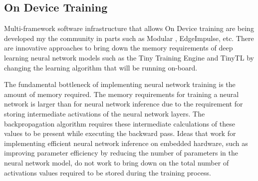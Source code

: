 \subsection{On Device Training}

Multi-framework software infrastructure that allows On Device training are being developed my the community in parts such as Modular \cite{mojo}, EdgeImpulse, etc. There are innovative approaches to bring down the memory requirements of deep learning neural network models such as the Tiny Training Engine \cite{lin2022ondevice} and TinyTL \cite{cai2021tinytl} by changing the learning algorithm that will be running on-board.

The fundamental bottleneck of implementing neural network training is the amount of memory required. The memory requirements for training a neural network is larger than for neural network inference due to the requirement for storing intermediate activations of the neural network layers. The backpropagation algorithm requires these intermediate calculations of these values to be present while executing the backward pass. Ideas that work for implementing efficient neural network inference on embedded hardware, such as improving parameter efficiency by reducing the number of parameters in the neural network model, do not work to bring down on the total number of activations values required to be stored during the training process.
